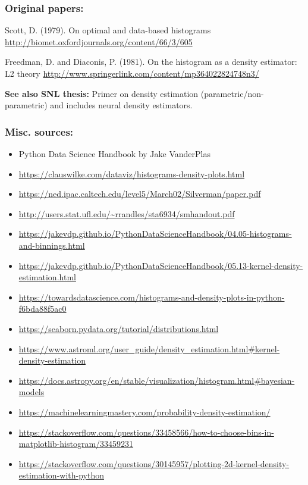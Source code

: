 \subsubsection*{Original papers:} 

Scott, D. (1979). On optimal and data-based histograms \url{http://biomet.oxfordjournals.org/content/66/3/605}

Freedman, D. and Diaconis, P. (1981). On the histogram as a density estimator: L2 theory \url{http://www.springerlink.com/content/mp364022824748n3/}

\textbf{See also SNL thesis:} Primer on density estimation (parametric/non-parametric) and includes neural density estimators. 

\subsubsection*{Misc. sources:}

\begin{itemize}
    \item Python Data Science Handbook by Jake VanderPlas
    \item \url{https://clauswilke.com/dataviz/histograms-density-plots.html}
    \item \url{https://ned.ipac.caltech.edu/level5/March02/Silverman/paper.pdf}
    \item \url{http://users.stat.ufl.edu/~rrandles/sta6934/smhandout.pdf}
    \item \url{https://jakevdp.github.io/PythonDataScienceHandbook/04.05-histograms-and-binnings.html}
    \item \url{https://jakevdp.github.io/PythonDataScienceHandbook/05.13-kernel-density-estimation.html}
    \item \url{https://towardsdatascience.com/histograms-and-density-plots-in-python-f6bda88f5ac0}
    \item \url{https://seaborn.pydata.org/tutorial/distributions.html}
    \item \url{https://www.astroml.org/user_guide/density_estimation.html#kernel-density-estimation}
    \item \url{https://docs.astropy.org/en/stable/visualization/histogram.html#bayesian-models}
    \item \url{https://machinelearningmastery.com/probability-density-estimation/}
    \item \url{https://stackoverflow.com/questions/33458566/how-to-choose-bins-in-matplotlib-histogram/33459231}
    \item \url{https://stackoverflow.com/questions/30145957/plotting-2d-kernel-density-estimation-with-python}
\end{itemize}



